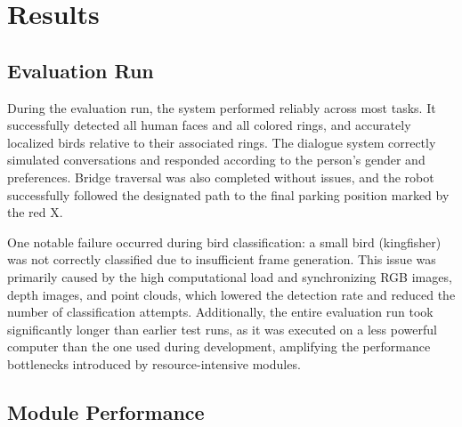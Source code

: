 \documentclass[a4paper]{article}
\begin{document}
\section{Results}

\subsection{Evaluation Run}

During the evaluation run, the system performed reliably across most tasks. It successfully detected all human faces and all colored rings, and accurately localized birds relative to their associated rings. The dialogue system correctly simulated conversations and responded according to the person's gender and preferences. Bridge traversal was also completed without issues, and the robot successfully followed the designated path to the final parking position marked by the red X.

One notable failure occurred during bird classification: a small bird (kingfisher) was not correctly classified due to insufficient frame generation. This issue was primarily caused by the high computational load and synchronizing RGB images, depth images, and point clouds, which lowered the detection rate and reduced the number of classification attempts. Additionally, the entire evaluation run took significantly longer than earlier test runs, as it was executed on a less powerful computer than the one used during development, amplifying the performance bottlenecks introduced by resource-intensive modules.



\subsection{Module Performance}
\end{document}
